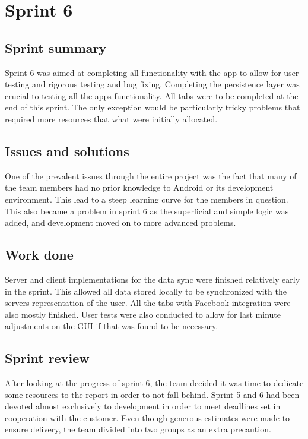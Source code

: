 \section{Sprint 6}
\subsection{Sprint summary}
Sprint 6 was aimed at completing all functionality with the app to allow for user testing and rigorous testing and bug fixing. Completing the persistence layer was crucial to testing all the apps functionality. All tabs were to be completed at the end of this sprint. The only exception would be particularly tricky problems that required more resources that what were initially allocated.


\subsection{Issues and solutions}
One of the prevalent issues through the entire project was the fact that many of the team members had no prior knowledge to Android or its development environment. This lead to a steep learning curve for the members in question. This also became a problem in sprint 6 as the superficial and simple logic was added, and development moved on to more advanced problems.

\subsection{Work done}
Server and client implementations for the data sync were finished relatively early in the sprint. This allowed all data stored locally to be synchronized with the servers representation of the user. All the tabs with Facebook integration were also mostly finished. User tests were also conducted to allow for last minute adjustments on the GUI if that was found to be necessary. 

\subsection{Sprint review}
After looking at the progress of sprint 6, the team decided it was time to dedicate some resources to the report in order to not fall behind. Sprint 5 and 6 had been devoted almost exclusively to development in order to meet deadlines set in cooperation with the customer. Even though generous estimates were made to ensure delivery, the team divided into two groups as an extra precaution. 